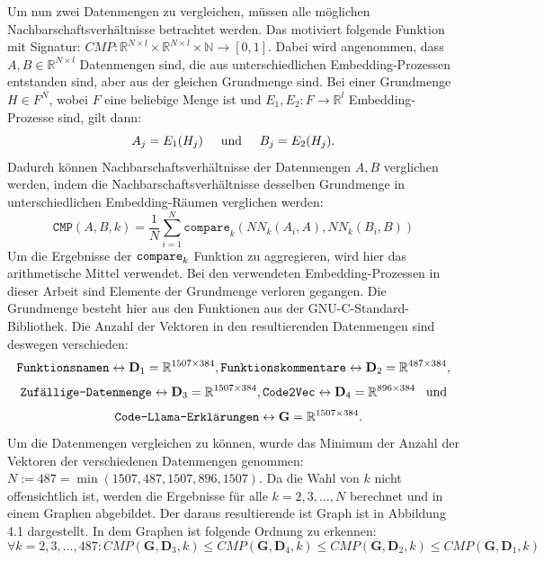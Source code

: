 \documentclass[12pt,letterpaper,ngerman]{article}
\begin{document}
Um nun zwei Datenmengen zu vergleichen, müssen alle möglichen 
Nachbarschaftsverhältnisse betrachtet werden. Das motiviert folgende
Funktion mit Signatur:
$CMP: \mathbb{R}^{N\times l} \times  \mathbb{R}^{N\times l} \times \mathbb{N} \to [0,1]$.
Dabei wird angenommen, dass $A,B \in \mathbb{R}^{N\times l}$ Datenmengen
sind, die aus unterschiedlichen Embedding-Prozessen entstanden sind,
aber aus der gleichen Grundmenge sind. Bei einer Grundmenge $H \in F^N$,
wobei $F$ eine beliebige Menge ist und   
$E_1,E_2: F \to \mathbb{R}^{l}$ Embedding-Prozesse sind, gilt dann:
\[
  A_j = E_1(H_j)  \hspace{0.5cm }\text{und} 
  \hspace{0.5cm } B_j = E_2(H_j).
\]
Dadurch können Nachbarschaftsverhältnisse der Datenmengen $A,B$ 
verglichen werden, indem die Nachbarschaftsverhältnisse desselben 
Grundmenge in unterschiedlichen Embedding-Räumen verglichen werden:
\[
  \texttt{CMP}(A,B,k) = \frac{1}{N}\sum_{i = 1}^{N}
    \texttt{compare}_k(NN_k(A_i,A),NN_k(B_i, B))
\]
Um die Ergebnisse der $\verb|compare|_k$ Funktion zu aggregieren,
wird hier das arithmetische Mittel verwendet.
Bei den verwendeten Embedding-Prozessen in dieser Arbeit sind
Elemente der Grundmenge verloren gegangen. Die Grundmenge besteht 
hier aus den Funktionen aus der GNU-C-Standard-Bibliothek.
Die Anzahl der Vektoren in den resultierenden Datenmengen sind
deswegen verschieden: 
\[
  \verb|Funktionsnamen| \leftrightarrow \mathbf{D}_1=\mathbb{R}^{1507\times 384},
  \verb|Funktionskommentare| \leftrightarrow \mathbf{D}_2=\mathbb{R}^{487\times 384},
\]
\[
  \verb|Zufällige-Datenmenge|\leftrightarrow \mathbf{D}_3=\mathbb{R}^{1507\times 384},
  \verb|Code2Vec| \leftrightarrow \mathbf{D}_4=\mathbb{R}^{896\times 384} \hspace{0.3cm}\text{und}
\]
\[
  \hspace{0.3cm} \verb|Code-Llama-Erklärungen| \leftrightarrow \mathbf{G}=\mathbb{R}^{1507\times 384}.
\]
Um die Datenmengen vergleichen zu können, wurde das Minimum der 
Anzahl der Vektoren der verschiedenen Datenmengen genommen:
$N:= 487 = \min(1507, 487, 1507, 896, 1507) $. Da die Wahl von $k$ nicht 
offensichtlich ist, werden die Ergebnisse für alle 
$k = 2, 3, \dots, N$ berechnet und in einem 
Graphen abgebildet. Der daraus resultierende ist Graph
ist in Abbildung 4.1 dargestellt. In dem Graphen ist folgende 
Ordnung zu erkennen: 
\[ 
  \forall k=2,3,\dots,487: CMP(\mathbf{G}, \mathbf{D}_3,k) \leq 
    CMP(\mathbf{G}, \mathbf{D}_4, k) \leq 
    CMP(\mathbf{G}, \mathbf{D}_2, k) \leq 
    CMP(\mathbf{G}, \mathbf{D}_1, k)
\]
\end{document}

